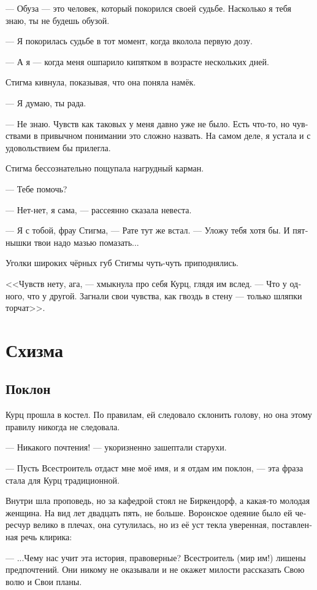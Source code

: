 \documentclass[a4paper,12pt,fleqn]{book}\usepackage{cooltooltips}\usepackage{polyglossia}\setdefaultlanguage[babelshorthands=true]{russian}\setotherlanguage{english}\defaultfontfeatures{Ligatures=TeX,Mapping=tex-text} \usepackage{xcolor}\definecolor{lightgray}{HTML}{bbbbbb}\color{lightgray}\newcommand{\ml}[3]{\textenglish{\textcolor{black}{#3}}}
\begin{document}
--- Обуза --- это человек, который покорился своей судьбе.
Насколько я тебя знаю, ты не будешь обузой.

--- Я покорилась судьбе в тот момент, когда вколола первую дозу.

--- А я --- когда меня ошпарило кипятком в возрасте нескольких дней.

Стигма кивнула, показывая, что она поняла намёк.

--- Я думаю, ты рада.

--- Не знаю.
Чувств как таковых у меня давно уже не было.
Есть что-то, но чувствами в привычном понимании это сложно назвать.
На самом деле, я устала и с удовольствием бы прилегла.

Стигма бессознательно пощупала нагрудный карман.

--- Тебе помочь?

--- Нет-нет, я сама, --- рассеянно сказала невеста.

--- Я с тобой, фрау Стигма, --- Рате тут же встал.
--- Уложу тебя хотя бы.
И пятнышки твои надо мазью помазать...

Уголки широких чёрных губ Стигмы чуть-чуть приподнялись.

<<Чувств нету, ага, --- хмыкнула про себя Курц, глядя им вслед.
--- Что у одного, что у другой.
Загнали свои чувства, как гвоздь в стену --- только шляпки торчат>>.

\chapter{Схизма}

\section{Поклон}

Курц прошла в костел.
По правилам, ей следовало склонить голову, но она этому правилу никогда не следовала.

--- Никакого почтения! --- укоризненно зашептали старухи.

--- Пусть Всестроитель отдаст мне моё имя, и я отдам им поклон, --- эта фраза стала для Курц традиционной.

Внутри шла проповедь, но за кафедрой стоял не Биркендорф, а какая-то молодая женщина.
На вид лет двадцать пять, не больше.
Воронское одеяние было ей чересчур велико в плечах, она сутулилась, но из её уст текла уверенная, поставленная речь клирика:

--- ...Чему нас учит эта история, правоверные?
Всестроитель (мир им!) лишены предпочтений.
Они никому не оказывали и не окажет милости рассказать Свою волю и Свои планы.
\end{document}
